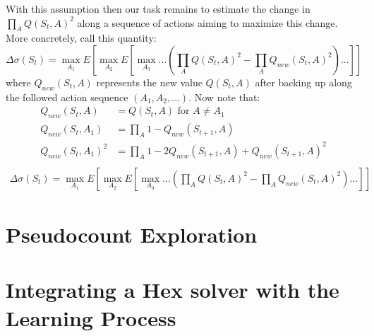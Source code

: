 \documentclass{article}
\begin{document}
With this assumption then our task remains to estimate the change in $\prod_A Q(S_t,A)^2$ along a sequence of actions aiming to maximize this change. More concretely, call this quantity:
$$\Delta \sigma(S_t) = \max_{A_1}E[\max_{A_2}E[\max_{A_3}...(\prod_A Q(S_t,A)^2-\prod_A Q_{new}(S_t,A)^2)...]]$$
where $Q_{new}(S_t,A)$ represents the new value $Q(S_t,A)$ after backing up along the followed action sequence $(A_1,A_2,...)$. Now note that:
\begin{align*}
Q_{new}(S_t,A) &=Q(S_t,A) \text{ for } A\neq A_1\\
Q_{new}(S_t,A_1) &=\prod_A 1-Q_{new}(S_{t+1},A)\\
Q_{new}(S_t,A_1)^2&=\prod_A 1-2Q_{new}(S_{t+1},A)+Q_{new}(S_{t+1},A)^2\\
\end{align*}
\begin{align*}
\Delta \sigma(S_t) = \max_{A_1}E[\max_{A_2}E[\max_{A_3}...(\prod_A Q(S_t,A)^2-\prod_A Q_{new}(S_t,A)^2)...]]
\end{align*}



\section*{Pseudocount Exploration}


\section*{Integrating a Hex solver with the Learning Process}
\end{document}
